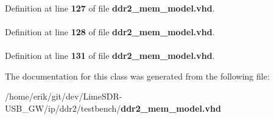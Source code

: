 \paragraph[{std\+\_\+logic\+\_\+arith}]{\hspace{0.3cm}{\ttfamily [Package]}}\label{classddr2__mem__model_a0f5ecc6613f63d07f7963a97b1b26095}


Definition at line {\bf 127} of file {\bf ddr2\+\_\+mem\+\_\+model.\+vhd}.

\paragraph[{std\+\_\+logic\+\_\+unsigned}]{\hspace{0.3cm}{\ttfamily [Package]}}\label{classddr2__mem__model_a598da929e807d58939b47499e8bc9fa8}


Definition at line {\bf 128} of file {\bf ddr2\+\_\+mem\+\_\+model.\+vhd}.

\paragraph[{textio}]{\hspace{0.3cm}{\ttfamily [Package]}}\label{classddr2__mem__model_aa8c4e25998323a84db5b1fa701b92fcb}


Definition at line {\bf 131} of file {\bf ddr2\+\_\+mem\+\_\+model.\+vhd}.



The documentation for this class was generated from the following file\+:\begin{DoxyCompactItemize}
\item 
/home/erik/git/dev/\+Lime\+S\+D\+R-\/\+U\+S\+B\+\_\+\+G\+W/ip/ddr2/testbench/{\bf ddr2\+\_\+mem\+\_\+model.\+vhd}\end{DoxyCompactItemize}
